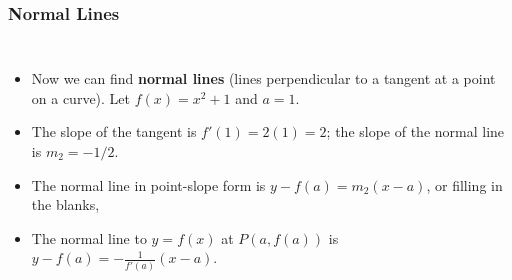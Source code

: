 \documentclass[serif,ignorenonframetext]{beamer}
\newcommand{\ds}{\displaystyle}
\begin{document}
\begin{frame}
  \frametitle{Normal Lines}
  \begin{columns}
  \begin{itemize}[<+->]
  \item Now we can find \textbf{normal lines} (lines perpendicular
    to a tangent at a point on a curve).  Let $f(x)=x^2+1$ and $a=1$.
  \item The slope of the tangent is $f'(1)=2(1)=2$;
    the slope of the normal line is $m_2=-1/2$.
  \item The normal line in point-slope form is
    $\ds  y-f(a)=m_2(x-a) $, or filling in the blanks,
  \item The normal line to $y=f(x)$ at $P(a,f(a))$ is 
    $\ds  y-f(a) = -\frac{1}{f'(a)} (x-a)$.
  \end{itemize}

\end{columns}
\end{frame}
\end{document}
